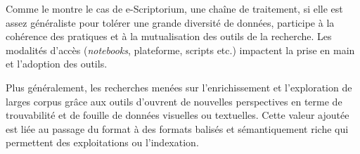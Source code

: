 Comme le montre le cas de e-Scriptorium, une chaîne de traitement, si elle est assez généraliste pour tolérer une grande diversité de données, participe à la cohérence des pratiques et à la mutualisation des outils de la recherche. Les modalités d'accès (\textit{notebooks}, plateforme, scripts etc.) impactent la prise en main et l'adoption des outils. 

Plus généralement, les recherches menées sur l'enrichissement et l'exploration de larges corpus grâce aux outils d'\ia ouvrent de nouvelles perspectives en terme de trouvabilité et de fouille de données visuelles ou textuelles. Cette valeur ajoutée est liée au passage du format \jpeg à des formats balisés et sémantiquement riche qui permettent des exploitations ou l'indexation. 